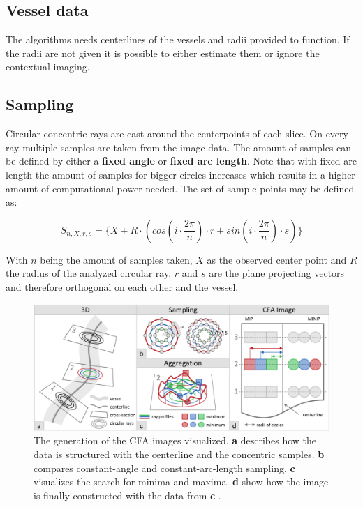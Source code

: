 \subsection{Vessel data}
The algorithms needs centerlines of the vessels and radii provided to function. If the radii are not given it is possible to either estimate them or ignore the contextual imaging.

\subsection{Sampling}
Circular concentric rays are cast around the centerpoints of each slice. On every ray multiple samples are taken from the image data. The amount of samples can be defined by either a \textbf{fixed angle} or \textbf{fixed arc length}. Note that with fixed arc length the amount of samples for bigger circles increases which results in a higher amount of computational power needed. The set of sample points may be defined as:

\begin{equation}
S_{n,X,r,s} = \{X + R \cdot (cos(i \cdot \frac{2\pi}{n})\cdot r + sin(i \cdot \frac{2\pi}{n}) \cdot s)\}
\end{equation}

With $n$ being the amount of samples taken, $X$ as the observed center point and $R$ the radius of the analyzed circular ray. $r$ and $s$ are the plane projecting vectors and therefore orthogonal on each other and the vessel.
\begin{figure}
	\includegraphics[width=2\columnwidth]{img/cfasampling}
	\caption{The generation of the CFA images visualized. \textbf{a} describes how the data is structured with the centerline and the concentric samples. \textbf{b} compares constant-angle and constant-arc-length sampling. \textbf{c} visualizes the search for minima and maxima. \textbf{d} show how the image is finally constructed with the data from \textbf{c} \cite{Mistelbauer2013}.}
\end{figure}


